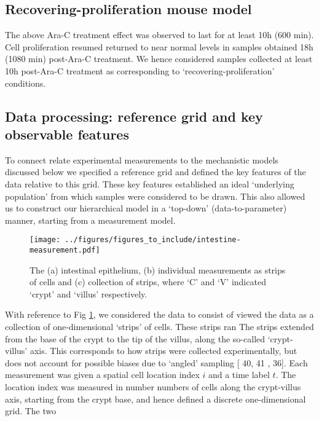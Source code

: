 \documentclass[10pt,letterpaper]{article}
\providecommand{\DIFaddtex}[1]{{\protect\color{blue} \sf #1}} %
\providecommand{\DIFdeltex}[1]{{\protect\color{red} \scriptsize #1}} %
\providecommand{\DIFaddbegin}{} %
\providecommand{\DIFaddend}{} %
\providecommand{\DIFdelbegin}{} %
\providecommand{\DIFdelend}{} %
\providecommand{\DIFadd}[1]{\texorpdfstring{\DIFaddtex{#1}}{#1}} %
\providecommand{\DIFdel}[1]{\texorpdfstring{\DIFdeltex{#1}}{}} %
\begin{document}
\subsection{Recovering-proliferation mouse
model}\label{recovering-proliferation-mouse-model}

The above Ara-C treatment effect was observed to last for at least 10h
(600 min). Cell proliferation \DIFdelbegin \DIFdel{resumed }\DIFdelend \DIFaddbegin \DIFadd{returned }\DIFaddend to near normal levels in samples
obtained 18h (1080 min) post-Ara-C treatment. We hence considered
samples collected at least 10h post-Ara-C treatment as corresponding to
`recovering-proliferation' conditions.

\subsection{Data processing: reference grid and key observable
features}\label{data-processing-reference-grid-and-key-observable-features}

To \DIFdelbegin \DIFdel{connect }\DIFdelend \DIFaddbegin \DIFadd{relate }\DIFaddend experimental measurements to the \DIFaddbegin \DIFadd{mechanistic }\DIFaddend models discussed
below we specified a reference grid and defined the key features of the
data relative to this grid. These key features established an ideal
`underlying population' from which samples were considered to be drawn.
This also allowed us to construct our hierarchical model in a
\DIFdelbegin \DIFdel{`top-down'
}\DIFdelend (data-to-parameter) manner, starting from a measurement model.

\begin{figure}
\centering
\texttt{[image: ../figures/figures\_to\_include/intestine-measurement.pdf]}
\caption{The (a) intestinal epithelium, (b) individual measurements as
strips of cells and (c) collection of strips, where `C' and `V'
indicated `crypt' and `villus'
respectively.\label{fig:intestine-measurement}}
\end{figure}

With reference to Fig \ref{fig:intestine-measurement}, we \DIFdelbegin \DIFdel{considered the
data to consist of }\DIFdelend \DIFaddbegin \DIFadd{viewed the
data as }\DIFaddend a collection of one-dimensional `strips' of cells. \DIFdelbegin \DIFdel{These strips
ran }\DIFdelend \DIFaddbegin \DIFadd{The strips
extended }\DIFaddend from the base of the crypt to the tip of the villus, along the
so-called `crypt-villus' axis. This corresponds to how strips were
collected experimentally, but does not account for possible biases due
to `angled' sampling {[}\DIFdelbegin \DIFdel{40, 41}\DIFdelend \DIFaddbegin \DIFadd{35, 36}\DIFaddend {]}. Each measurement was given a spatial
cell location index \(i\) and a time label \(t\). The location index was
measured in \DIFdelbegin \DIFdel{number }\DIFdelend \DIFaddbegin \DIFadd{numbers }\DIFaddend of cells along the crypt-villus axis, starting from
the crypt base, and hence defined a discrete one-dimensional grid.
\DIFdelbegin \DIFdel{The two }\DIFdelend \DIFaddbegin 
\end{document}
